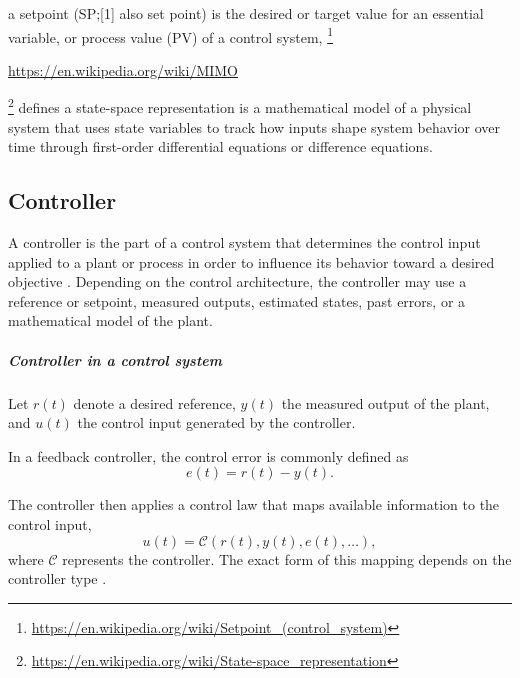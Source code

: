 \documentclass{book}
\providecommand{\seeherefooter}[1]{\footnote{\url{#1}}}
\providecommand{\clickurlfooter}[1]{\footnote{\url{#1}}}
\begin{document}

a setpoint (SP;[1] also set point) is the desired or target value for an essential variable, or process value (PV) of a control system, \seeherefooter{https://en.wikipedia.org/wiki/Setpoint_(control_system)}


\url{https://en.wikipedia.org/wiki/MIMO}


\clickurlfooter{https://en.wikipedia.org/wiki/State-space_representation} defines a state-space representation is a mathematical model of a physical system that uses state variables to track how inputs shape system behavior over time through first-order differential equations or difference equations. 

\subsection{Controller}


A controller is the part of a control system that determines the control input applied to a plant or process in order to influence its behavior toward a desired objective \cite{astrom-2008-feedback-systems-an-introduction-for-scientists-and-engineers}. Depending on the control architecture, the controller may use a reference or setpoint, measured outputs, estimated states, past errors, or a mathematical model of the plant.

   \subparagraph{Controller in a control system}
      Let $r(t)$ denote a desired reference, $y(t)$ the measured output of the plant, and $u(t)$ the control input generated by the controller.

      In a feedback controller, the control error is commonly defined as
      \[
         e(t)=r(t)-y(t).
      \]

      The controller then applies a control law that maps available information to the control input,
      \[
         u(t)=\mathcal{C}(r(t),y(t),e(t),\ldots),
      \]
      where $\mathcal{C}$ represents the controller. The exact form of this mapping depends on the controller type \cite{astrom-2008-feedback-systems-an-introduction-for-scientists-and-engineers}.
\end{document}
